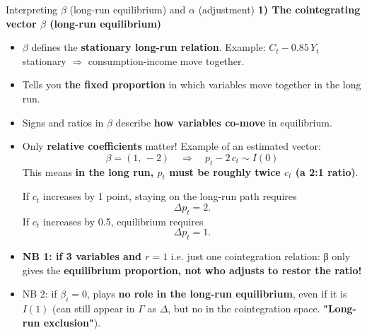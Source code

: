 \documentclass{beamer}
\begin{document}
\begin{frame}{Interpreting $\beta$ (long-run equilibrium) and $\alpha$ (adjustment)}
\footnotesize
\textbf{1) The cointegrating vector $\beta$ (long-run equilibrium)}
\begin{itemize}
  \item $\beta$ defines the \textbf{stationary long-run relation}.  
        Example: $C_t - 0.85\,Y_t$ stationary $\Rightarrow$ consumption-income move together.
        \item   Tells you \textbf{the fixed proportion} in which variables move together
        in the long run.
  \item Signs and ratios in $\beta$ describe \textbf{how variables co-move} in equilibrium.
  \item Only \textbf{relative coefficients} matter! Example of an estimated vector:
    \[
        \beta = (1,\,-2) \quad \Rightarrow \quad p_t - 2\,c_t \sim I(0)
        \]
        This means \textbf{in the long run, $p_t$ must be roughly twice $c_t$ (a 2:1 ratio)}.

        
        If $c_t$ increases by 1 point, staying on the long-run path requires  
        \[
        \Delta p_t = 2.
        \]
        If $c_t$ increases by 0.5, equilibrium requires  
        \[
        \Delta p_t = 1.
        \]
  \item \textbf{NB 1: if 3 variables and $r=1$} i.e. just one cointegration relation: β only gives the \textbf{equilibrium proportion, not who adjusts to  restor the ratio!}
  \item NB 2: if $\beta_i=0$,  plays \textbf{no role in the long-run equilibrium}, even if it is $I(1)$ (can still appear in $\Gamma$ as $\Delta$, but no in the cointegration space. \textbf{"Long-run exclusion"}).
\end{itemize}
\end{frame}
\end{document}
